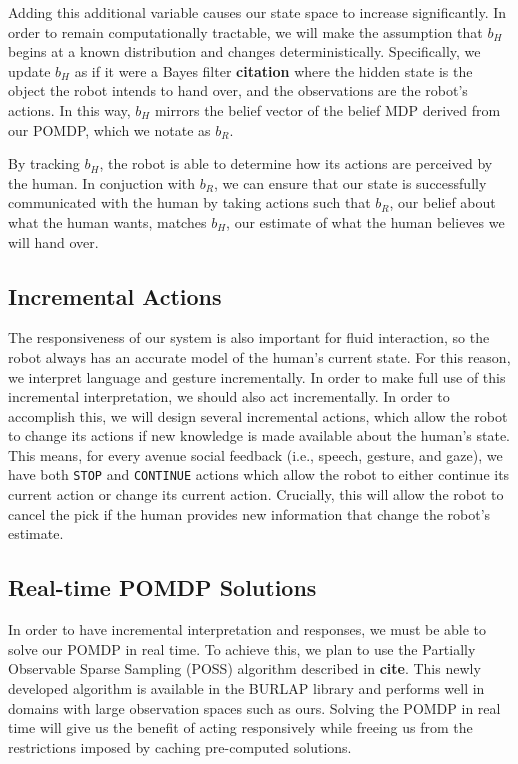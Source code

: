 \documentclass{article}
\begin{document}
Adding this additional variable causes our state space to increase significantly. In order to remain computationally tractable, we will make the assumption that $b_H$ begins at a known distribution and changes deterministically. Specifically, we update $b_H$ as if it were a Bayes filter \textbf{citation} where the hidden state is the object the robot intends to hand over, and the observations are the robot's actions. In this way, $b_H$ mirrors the belief vector of the belief MDP derived from our POMDP, which we notate as $b_R$. 

By tracking $b_H$, the robot is able to determine how its actions are perceived by the human. In conjuction with $b_R$, we can ensure that our state is successfully communicated with the human by taking actions such that $b_R$, our belief about what the human wants, matches $b_H$, our estimate of what the human believes we will hand over. 


\subsection{Incremental Actions}

The responsiveness of our system is also important for fluid interaction, so the robot always has an accurate model of the human's current state. For this reason, we interpret language and gesture incrementally. In order to make full use of this incremental interpretation, we should also act incrementally. In order to accomplish this, we will design several incremental actions, which allow the robot to change its actions if new knowledge is made available about the human's state. This means, for every avenue social feedback (i.e., speech, gesture, and gaze), we have both \texttt{STOP} and \texttt{CONTINUE} actions which allow the robot to either continue its current action or change its current action. Crucially, this will allow the robot to cancel the pick if the human provides new information that change the robot's estimate. 

\subsection{Real-time POMDP Solutions}

In order to have incremental interpretation and responses, we must be able to solve our POMDP in real time. To achieve this, we plan to use the Partially Observable Sparse Sampling (POSS) algorithm described in \textbf{cite}. This newly developed algorithm is available in the BURLAP library and performs well in domains with large observation spaces such as ours. Solving the POMDP in real time will give us the benefit of acting responsively while freeing us from the restrictions imposed by caching pre-computed solutions. 
\end{document}

